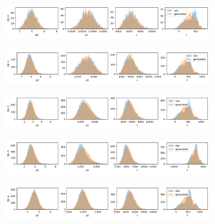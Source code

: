 \begin{figure}[H]
    \centering
\begin{subfigure}[b]{0.85\textwidth}
    \centering
    \includegraphics[width=\linewidth]{figures/chapter4/surrogates/p3_histos_pre_0.png}
  \end{subfigure}
\begin{subfigure}[b]{0.85\textwidth}
    \centering
    \includegraphics[width=\linewidth]{figures/chapter4/surrogates/p3_histos_pre_1.png}
  \end{subfigure}
\begin{subfigure}[b]{0.85\textwidth}
    \centering
    \includegraphics[width=\linewidth]{figures/chapter4/surrogates/p3_histos_pre_2.png}
  \end{subfigure}
\begin{subfigure}[b]{0.85\textwidth}
    \centering
    \includegraphics[width=\linewidth]{figures/chapter4/surrogates/p3_histos_pre_3.png}
  \end{subfigure}
\begin{subfigure}[b]{0.85\textwidth}
    \centering
    \includegraphics[width=\linewidth]{figures/chapter4/surrogates/p3_histos_pre_4.png}

\end{subfigure}
\end{figure}

